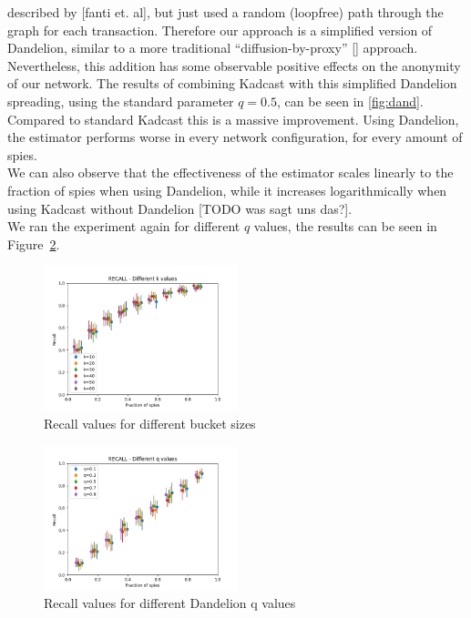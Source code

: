 described by [fanti et. al], but just used a random (loopfree) path through
the graph for each transaction. Therefore our approach is a simplified
version of Dandelion, similar to a more traditional
``diffusion-by-proxy'' [] approach. Nevertheless, this addition has some observable
positive effects on the anonymity of our network. The results of 
combining Kadcast with this simplified Dandelion spreading, using
the standard parameter $q = 0.5$, can be seen in \ref{fig:dand}. Compared to
standard Kadcast this is a massive improvement. Using Dandelion, the
estimator performs worse in every network configuration, for every
amount of spies. \\
We can also observe that the effectiveness of
the estimator scales linearly to the fraction of spies when using Dandelion, while it
increases logarithmically when using Kadcast without Dandelion [TODO was
sagt uns das?]. \\
We ran the experiment again for different $q$ values, the results can
be seen in Figure~\ref{fig:allq_r}.

\begin{figure}
  \centering
      \includegraphics[width=0.5\textwidth]{figs/allks_recall}
  \caption{Recall values for different bucket sizes}
  \label{fig:allk_r}
\end{figure}


\begin{figure}
  \centering
      \includegraphics[width=0.5\textwidth]{figs/allqs_recall}
  \caption{Recall values for different Dandelion q values}
  \label{fig:allq_r}
\end{figure}

